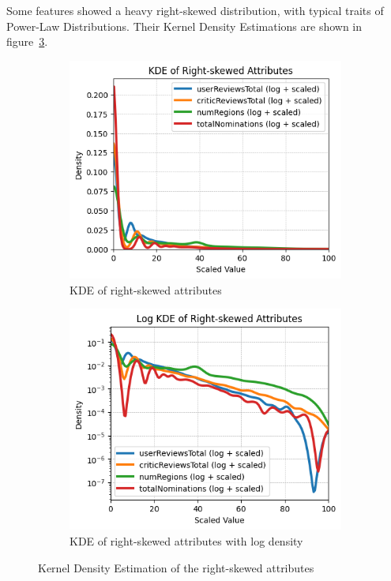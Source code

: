 Some features showed a heavy right-skewed distribution, with typical traits of Power-Law Distributions. Their Kernel Density Estimations are shown in figure~\ref{fig:left_skewed}.
\vspace{1em}
\begin{figure}[H]
    \centering
    \begin{subfigure}{0.48\textwidth}
        \includegraphics[width=\textwidth]{plots/left_skew_distribs.png}
        \captionsetup{width=0.9\linewidth, justification=centering}
        \caption{KDE of right-skewed attributes}
        \label{fig:sub1_KDE_left_skew}
    \end{subfigure}
    \begin{subfigure}{0.48\textwidth}
        \includegraphics[width=\textwidth]{plots/left_skew_distribs_log.png}
        \captionsetup{width=0.9\linewidth, justification=centering}
        \caption{KDE of right-skewed attributes with log density}
        \label{fig:sub2_KDE_left_skew}
    \end{subfigure}
    \caption{Kernel Density Estimation of the right-skewed attributes}
    \label{fig:left_skewed}
\end{figure}

